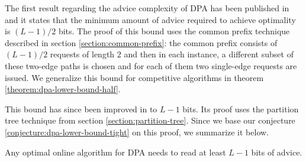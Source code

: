 The first result regarding the advice complexity of DPA has been published
in \cite{komm-thesis} and it states that the minimum amount of advice
required to achieve optimality is $(L-1)/2$ bits. The proof of this bound
uses the common prefix technique described in section
\ref{section:common-prefix}: the common prefix consists of $(L-1)/2$
requests of length $2$ and then in each instance, a different subset of
these two-edge paths is chosen and for each of them two single-edge
requests are issued. We generalize this bound for competitive algorithms
in theorem \ref{theorem:dpa-lower-bound-half}.

This bound has since been improved in \cite{sofsem2014} to $L-1$ bits. Its
proof uses the partition tree technique from section
\ref{section:partition-tree}. Since we base our conjecture
\ref{conjecture:dpa-lower-bound-tight} on this proof, we summarize it
below.

\begin{theorem}\label{theorem:dpa-lower-optimal}
    Any optimal online algorithm for DPA needs to read at least $L-1$ bits
    of advice.
\end{theorem}

